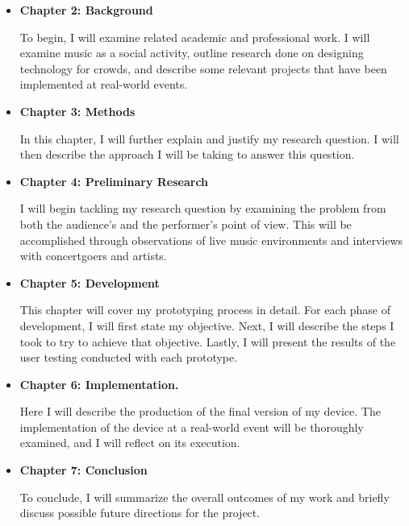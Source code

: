 \begin{itemize}
	\item \textbf{Chapter 2: Background}
	
	To begin, I will examine related academic and professional work. I will examine music as a social activity, outline research done on designing technology for crowds, and describe some relevant projects that have been implemented at real-world events.
	
	\item \textbf{Chapter 3: Methods}
	
	In this chapter, I will further explain and justify my research question. I will then describe the approach I will be taking to answer this question.
	
	\item \textbf{Chapter 4: Preliminary Research}
	
	I will begin tackling my research question by examining the problem from both the audience's and the performer's point of view. This will be accomplished through observations of live music environments and interviews with concertgoers and artists.
	
	\item \textbf{Chapter 5: Development}
	
	This chapter will cover my prototyping process in detail. For each phase of development, I will first state my objective. Next, I will describe the steps I took to try to achieve that objective. Lastly, I will present the results of the user testing conducted with each prototype.
		
	\item \textbf{Chapter 6: Implementation.}
	
	Here I will describe the production of the final version of my device. The implementation of the device at a real-world event will be thoroughly examined, and I will reflect on its execution.
	
	\item \textbf{Chapter 7: Conclusion}
	
	To conclude, I will summarize the overall outcomes of my work and briefly discuss possible future directions for the project.
\end{itemize}